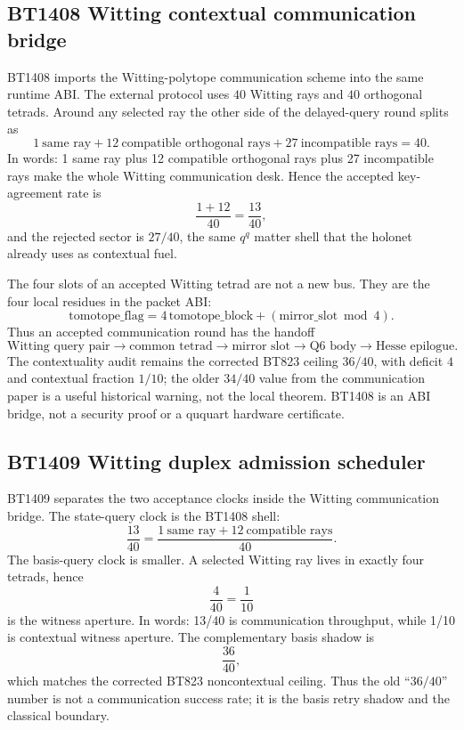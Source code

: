 \documentclass[11pt]{article}
\begin{document}
\subsection{BT1408 Witting contextual communication bridge}

BT1408 imports the Witting-polytope communication scheme into the same runtime
ABI.  The external protocol uses \(40\) Witting rays and \(40\) orthogonal
tetrads.  Around any selected ray the other side of the delayed-query round
splits as
\[
  1\ \text{same ray}
  +12\ \text{compatible orthogonal rays}
  +27\ \text{incompatible rays}
  =40.
\]
In words: 1 same ray plus 12 compatible orthogonal rays plus 27 incompatible
rays make the whole Witting communication desk.  Hence the accepted
key-agreement rate is
\[
  \frac{1+12}{40}=\frac{13}{40},
\]
and the rejected sector is \(27/40\), the same \(q^q\) matter shell that the
holonet already uses as contextual fuel.

The four slots of an accepted Witting tetrad are not a new bus.  They are the
four local residues in the packet ABI:
\[
  \text{tomotope\_flag}
  =4\,\text{tomotope\_block}+(\text{mirror\_slot}\bmod 4).
\]
Thus an accepted communication round has the handoff
\[
  \text{Witting query pair}
  \to \text{common tetrad}
  \to \text{mirror slot}
  \to \text{Q6 body}
  \to \text{Hesse epilogue}.
\]
The contextuality audit remains the corrected BT823 ceiling
\(36/40\), with deficit \(4\) and contextual fraction \(1/10\); the older
\(34/40\) value from the communication paper is a useful historical warning,
not the local theorem.  BT1408 is an ABI bridge, not a security proof or a
ququart hardware certificate.

\subsection{BT1409 Witting duplex admission scheduler}

BT1409 separates the two acceptance clocks inside the Witting communication
bridge.  The state-query clock is the BT1408 shell:
\[
  \frac{13}{40}
  =\frac{1\ \text{same ray}+12\ \text{compatible rays}}{40}.
\]
The basis-query clock is smaller.  A selected Witting ray lives in exactly four
tetrads, hence
\[
  \frac{4}{40}=\frac1{10}
\]
is the witness aperture.  In words: 13/40 is communication throughput, while
1/10 is contextual witness aperture.  The complementary basis shadow is
\[
  \frac{36}{40},
\]
which matches the corrected BT823 noncontextual ceiling.  Thus the old
``\(36/40\)'' number is not a communication success rate; it is the basis retry
shadow and the classical boundary.
\end{document}
